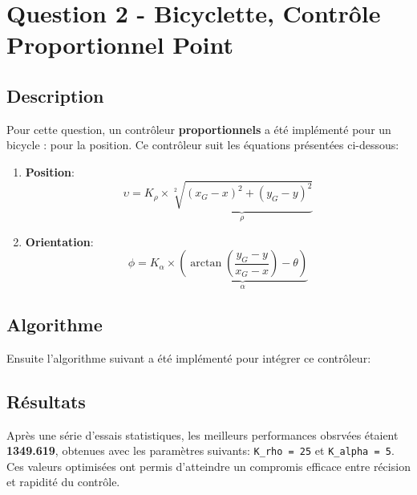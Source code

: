 \documentclass[../CSC_5RO16_TA_TP3.tex]{subfiles}
\begin{document}
\section{Question 2 - Bicyclette, Contrôle Proportionnel Point}

\subsection{Description}
\noindent Pour cette question, un contrôleur \textbf{proportionnels} a été implémenté pour un bicycle : pour la position. Ce contrôleur suit les équations présentées ci-dessous:
\begin{enumerate}
    \item \textbf{Position}:
    \begin{equation}
        \upsilon = K_{\rho} \times \underbrace{\sqrt[2]{(x_{G} - x)^2 + (y_{G} - y)^2}}_{\rho}
    \end{equation}
    \item \textbf{Orientation}:
    \begin{equation}
        \phi = K_{\alpha} \times \underbrace{\left(\arctan\left(\frac{y_{G} - y}{x_{G} - x}\right) - \theta\right)}_{\alpha}
    \end{equation}
\end{enumerate}

\subsection{Algorithme}
\noindent Ensuite l'algorithme suivant a été implémenté pour intégrer ce contrôleur:
\begin{scriptsize}\mycode
    
\end{scriptsize}

\subsection{Résultats}
\noindent Après une série d'essais statistiques, les meilleurs performances obsrvées étaient \textbf{1349.619}, obtenues avec les paramètres suivants: \texttt{K\_rho = 25} et \texttt{K\_alpha = 5}.\\

\noindent Ces valeurs optimisées ont permis d'atteindre un compromis efficace entre récision et rapidité du contrôle.
\end{document}
